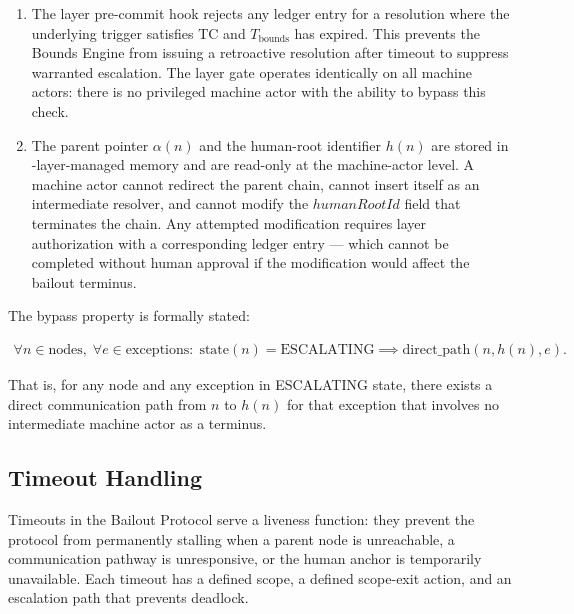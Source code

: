 \begin{enumerate}
\item[\textbf{Fact Layer gate.}] The \fact{} layer pre-commit hook rejects any ledger entry for a resolution where the underlying trigger satisfies TC and $T_{\text{bounds}}$ has expired. This prevents the Bounds Engine from issuing a retroactive resolution after timeout to suppress warranted escalation. The \fact{} layer gate operates identically on all machine actors: there is no privileged machine actor with the ability to bypass this check.

\item[\textbf{Immutable parent-pointer and human-root architecture.}] The parent pointer $\alpha(n)$ and the human-root identifier $h(n)$ are stored in \fact-layer-managed memory and are read-only at the machine-actor level. A machine actor cannot redirect the parent chain, cannot insert itself as an intermediate resolver, and cannot modify the $humanRootId$ field that terminates the chain. Any attempted modification requires \purpose{} layer authorization with a corresponding ledger entry — which cannot be completed without human approval if the modification would affect the bailout terminus.
\end{enumerate}

The bypass property is formally stated:

\begin{align}
\forall n \in \text{nodes},\; \forall e \in \text{exceptions}:\; \text{state}(n) = \text{ESCALATING} \implies \text{direct\_path}(n, h(n), e). \tag{BP}
\end{align}

That is, for any node and any exception in ESCALATING state, there exists a direct communication path from $n$ to $h(n)$ for that exception that involves no intermediate machine actor as a terminus.

\subsection{Timeout Handling}\label{sec:timeout-handling}

Timeouts in the Bailout Protocol serve a liveness function: they prevent the protocol from permanently stalling when a parent node is unreachable, a communication pathway is unresponsive, or the human anchor is temporarily unavailable. Each timeout has a defined scope, a defined scope-exit action, and an escalation path that prevents deadlock.

